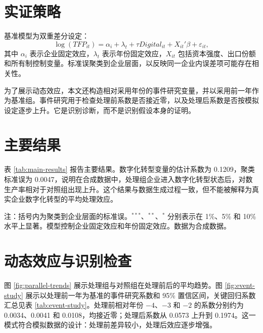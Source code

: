 \documentclass[11pt]{ctexart}
\begin{document}
\section{实证策略}

基准模型为双重差分设定：
\begin{equation}
\log(TFP_{it}) = \alpha_i + \lambda_t + \tau Digital_{it} + X_{it}'\beta + \varepsilon_{it},
\end{equation}
其中 $\alpha_i$ 表示企业固定效应，$\lambda_t$ 表示年份固定效应，$X_{it}$ 包括资本强度、出口份额和所有制控制变量。标准误聚类到企业层面，以反映同一企业内误差项可能存在相关性。

为了展示动态效应，本文还构造相对采用年份的事件研究变量，并以采用前一年作为基准组。事件研究用于检查处理前系数是否接近零，以及处理后系数是否按模拟设定逐步上升。它是识别诊断，而不是识别假设本身的证明。

\section{主要结果}

表 \ref{tab:main-results} 报告主要结果。数字化转型变量的估计系数为 0.1209，聚类标准误为 0.0047，说明在合成数据中，处理组企业进入数字化转型状态后，对数生产率相对于对照组出现上升。这个结果与数据生成过程一致，但不能被解释为真实企业数字化转型的平均处理效应。

\begin{table}[htbp]
\centering
\caption{DID 主估计结果}
\label{tab:main-results}

\begin{flushleft}
\footnotesize 注：括号内为聚类到企业层面的标准误。$^{***}$、$^{**}$、$^{*}$ 分别表示在 1\%、5\% 和 10\% 水平上显著。模型控制企业固定效应和年份固定效应。数据为合成数据。
\end{flushleft}
\end{table}

\section{动态效应与识别检查}

图 \ref{fig:parallel-trends} 展示处理组与对照组在处理前后的平均趋势。图 \ref{fig:event-study} 展示以处理前一年为基准的事件研究系数和 95\% 置信区间，关键回归系数汇总见表 \ref{tab:event-study}。处理前相对年份 $-4$、$-3$ 和 $-2$ 的系数分别约为 0.0034、0.0041 和 0.0108，均接近零；处理后系数从 0.0573 上升到 0.1974。这一模式符合模拟数据的设计：处理前差异较小，处理后效应逐步增强。
\end{document}

